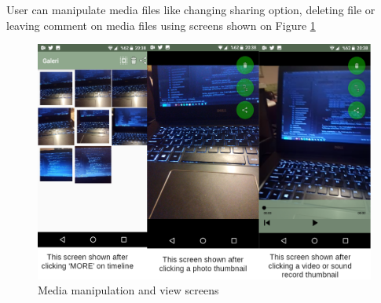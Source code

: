 \newpage

User can manipulate media files like changing sharing option, deleting file or leaving comment on media files using screens shown on Figure \ref{fig:media}


\begin{figure}[!htbp]
\centering
\includegraphics[width=\textwidth]{projectChapters/images/media.png}
\caption{Media manipulation and view screens}
\label{fig:media}
\end{figure}




